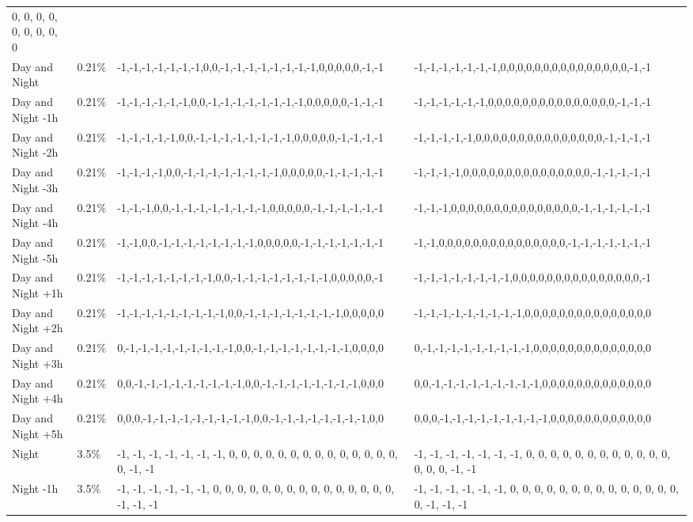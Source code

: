 \begin{longtable}[]{@{}llll@{}}
0, 0, 0, 0, 0, 0, 0, 0, 0 \\
Day and Night & 0.21\% &
-1,-1,-1,-1,-1,-1,-1,0,0,-1,-1,-1,-1,-1,-1,-1,-1,0,0,0,0,0,-1,-1 &
-1,-1,-1,-1,-1,-1,-1,0,0,0,0,0,0,0,0,0,0,0,0,0,0,0,-1,-1 \\
Day and Night -1h & 0.21\% &
-1,-1,-1,-1,-1,-1,0,0,-1,-1,-1,-1,-1,-1,-1,-1,0,0,0,0,0,-1,-1,-1 &
-1,-1,-1,-1,-1,-1,0,0,0,0,0,0,0,0,0,0,0,0,0,0,0,-1,-1,-1 \\
Day and Night -2h & 0.21\% &
-1,-1,-1,-1,-1,0,0,-1,-1,-1,-1,-1,-1,-1,-1,0,0,0,0,0,-1,-1,-1,-1 &
-1,-1,-1,-1,-1,0,0,0,0,0,0,0,0,0,0,0,0,0,0,0,-1,-1,-1,-1 \\
Day and Night -3h & 0.21\% &
-1,-1,-1,-1,0,0,-1,-1,-1,-1,-1,-1,-1,-1,0,0,0,0,0,-1,-1,-1,-1,-1 &
-1,-1,-1,-1,0,0,0,0,0,0,0,0,0,0,0,0,0,0,0,-1,-1,-1,-1,-1 \\
Day and Night -4h & 0.21\% &
-1,-1,-1,0,0,-1,-1,-1,-1,-1,-1,-1,-1,0,0,0,0,0,-1,-1,-1,-1,-1,-1 &
-1,-1,-1,0,0,0,0,0,0,0,0,0,0,0,0,0,0,0,-1,-1,-1,-1,-1,-1 \\
Day and Night -5h & 0.21\% &
-1,-1,0,0,-1,-1,-1,-1,-1,-1,-1,-1,0,0,0,0,0,-1,-1,-1,-1,-1,-1,-1 &
-1,-1,0,0,0,0,0,0,0,0,0,0,0,0,0,0,0,-1,-1,-1,-1,-1,-1,-1 \\
Day and Night +1h & 0.21\% &
-1,-1,-1,-1,-1,-1,-1,-1,0,0,-1,-1,-1,-1,-1,-1,-1,-1,0,0,0,0,0,-1 &
-1,-1,-1,-1,-1,-1,-1,-1,0,0,0,0,0,0,0,0,0,0,0,0,0,0,0,-1 \\
Day and Night +2h & 0.21\% &
-1,-1,-1,-1,-1,-1,-1,-1,-1,0,0,-1,-1,-1,-1,-1,-1,-1,-1,0,0,0,0,0 &
-1,-1,-1,-1,-1,-1,-1,-1,-1,0,0,0,0,0,0,0,0,0,0,0,0,0,0,0 \\
Day and Night +3h & 0.21\% &
0,-1,-1,-1,-1,-1,-1,-1,-1,-1,0,0,-1,-1,-1,-1,-1,-1,-1,-1,0,0,0,0 &
0,-1,-1,-1,-1,-1,-1,-1,-1,-1,0,0,0,0,0,0,0,0,0,0,0,0,0,0 \\
Day and Night +4h & 0.21\% &
0,0,-1,-1,-1,-1,-1,-1,-1,-1,-1,0,0,-1,-1,-1,-1,-1,-1,-1,-1,0,0,0 &
0,0,-1,-1,-1,-1,-1,-1,-1,-1,-1,0,0,0,0,0,0,0,0,0,0,0,0,0 \\
Day and Night +5h & 0.21\% &
0,0,0,-1,-1,-1,-1,-1,-1,-1,-1,-1,0,0,-1,-1,-1,-1,-1,-1,-1,-1,0,0 &
0,0,0,-1,-1,-1,-1,-1,-1,-1,-1,-1,0,0,0,0,0,0,0,0,0,0,0,0 \\
Night & 3.5\% & -1, -1, -1, -1, -1, -1, -1, 0, 0, 0, 0, 0, 0, 0, 0, 0,
0, 0, 0, 0, 0, 0, -1, -1 & -1, -1, -1, -1, -1, -1, -1, 0, 0, 0, 0, 0, 0,
0, 0, 0, 0, 0, 0, 0, 0, 0, -1, -1 \\
Night -1h & 3.5\% & -1, -1, -1, -1, -1, -1, 0, 0, 0, 0, 0, 0, 0, 0, 0,
0, 0, 0, 0, 0, 0, -1, -1, -1 & -1, -1, -1, -1, -1, -1, 0, 0, 0, 0, 0, 0,
0, 0, 0, 0, 0, 0, 0, 0, 0, -1, -1, -1 \\

\end{longtable}
